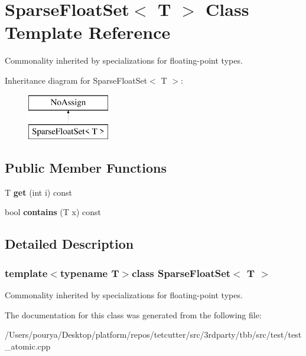 \hypertarget{classSparseFloatSet}{}\section{Sparse\+Float\+Set$<$ T $>$ Class Template Reference}
\label{classSparseFloatSet}


Commonality inherited by specializations for floating-\/point types.  


Inheritance diagram for Sparse\+Float\+Set$<$ T $>$\+:\begin{figure}[H]
\begin{center}
\leavevmode
\includegraphics[height=2.000000cm]{classSparseFloatSet}
\end{center}
\end{figure}
\subsection*{Public Member Functions}
\begin{DoxyCompactItemize}
\item 
\hypertarget{classSparseFloatSet_a1711258ac89aa6a95119680b238d17e6}{}T {\bfseries get} (int i) const \label{classSparseFloatSet_a1711258ac89aa6a95119680b238d17e6}

\item 
\hypertarget{classSparseFloatSet_a81f87857d3bbcd039bb3f1286e7c39ab}{}bool {\bfseries contains} (T x) const \label{classSparseFloatSet_a81f87857d3bbcd039bb3f1286e7c39ab}

\end{DoxyCompactItemize}


\subsection{Detailed Description}
\subsubsection*{template$<$typename T$>$class Sparse\+Float\+Set$<$ T $>$}

Commonality inherited by specializations for floating-\/point types. 

The documentation for this class was generated from the following file\+:\begin{DoxyCompactItemize}
\item 
/\+Users/pourya/\+Desktop/platform/repos/tetcutter/src/3rdparty/tbb/src/test/test\+\_\+atomic.\+cpp\end{DoxyCompactItemize}
